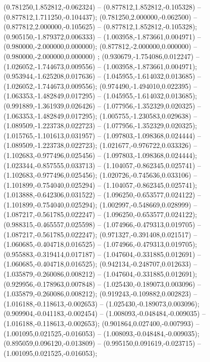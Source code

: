  (0.781250,1.852812,-0.062324) -- (0.877812,1.852812,-0.105328) -- (0.877812,1.711250,-0.104437);
 (0.781250,2.000000,-0.062500) -- (0.877812,2.000000,-0.105625) -- (0.877812,1.852812,-0.105328);
 (0.905150,-1.879372,0.006333) -- (1.003958,-1.873661,0.004971) -- (0.980000,-2.000000,0.000000);
 (0.877812,-2.000000,0.000000) -- (0.980000,-2.000000,0.000000) ;
 (0.930679,-1.754086,0.012247) -- (1.026052,-1.744673,0.009556) -- (1.003958,-1.873661,0.004971);
 (0.953944,-1.625208,0.017636) -- (1.045955,-1.614032,0.013685) -- (1.026052,-1.744673,0.009556);
 (0.974490,-1.494010,0.022395) -- (1.063353,-1.482849,0.017295) -- (1.045955,-1.614032,0.013685);
 (0.991889,-1.361939,0.026426) -- (1.077956,-1.352329,0.020325) -- (1.063353,-1.482849,0.017295);
 (1.005755,-1.230583,0.029638) -- (1.089509,-1.223738,0.022723) -- (1.077956,-1.352329,0.020325);
 (1.015765,-1.101613,0.031957) -- (1.097803,-1.098368,0.024444) -- (1.089509,-1.223738,0.022723);
 (1.021677,-0.976722,0.033326) -- (1.102683,-0.977496,0.025456) -- (1.097803,-1.098368,0.024444);
 (1.023344,-0.857555,0.033713) -- (1.104057,-0.862345,0.025741) -- (1.102683,-0.977496,0.025456);
 (1.020726,-0.745636,0.033106) -- (1.101899,-0.754040,0.025294) -- (1.104057,-0.862345,0.025741);
 (1.013888,-0.642306,0.031522) -- (1.096250,-0.653577,0.024122) -- (1.101899,-0.754040,0.025294);
 (1.002997,-0.548669,0.028999) -- (1.087217,-0.561785,0.022247) -- (1.096250,-0.653577,0.024122);
 (0.988315,-0.465557,0.025598) -- (1.074966,-0.479313,0.019705) -- (1.087217,-0.561785,0.022247);
 (0.971327,-0.391408,0.021517) -- (1.060685,-0.404718,0.016525) -- (1.074966,-0.479313,0.019705);
 (0.955883,-0.319414,0.017187) -- (1.047604,-0.331885,0.012691) -- (1.060685,-0.404718,0.016525);
 (0.942134,-0.248707,0.012633) -- (1.035879,-0.260086,0.008212) -- (1.047604,-0.331885,0.012691);
 (0.929956,-0.178963,0.007848) -- (1.025430,-0.189073,0.003096) -- (1.035879,-0.260086,0.008212);
 (0.919243,-0.109882,0.002823) -- (1.016188,-0.118613,-0.002653) -- (1.025430,-0.189073,0.003096);
 (0.909904,-0.041183,-0.002454) -- (1.008093,-0.048484,-0.009035) -- (1.016188,-0.118613,-0.002653);
 (0.901864,0.027400,-0.007993) -- (1.001095,0.021525,-0.016053) -- (1.008093,-0.048484,-0.009035);
 (0.895059,0.096120,-0.013809) -- (0.995150,0.091619,-0.023715) -- (1.001095,0.021525,-0.016053);
